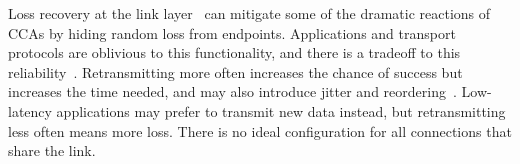 Loss recovery at the link layer~\cite{3gpp5gstandard,le2022link,ieee80211e} can
mitigate some of the dramatic reactions of CCAs by hiding random loss from
endpoints.
Applications and transport protocols are oblivious to this
functionality, and there is a tradeoff to this reliability~\cite{klingler2018impact,kliazovich2012arqproxy}.
Retransmitting more often increases the chance
of success but increases the time needed, and may also introduce
jitter and reordering~\cite{leung2007overview}.
Low-latency applications may prefer to transmit new data instead, but
retransmitting less often means more loss.
There is no ideal configuration for all connections that share the link.



